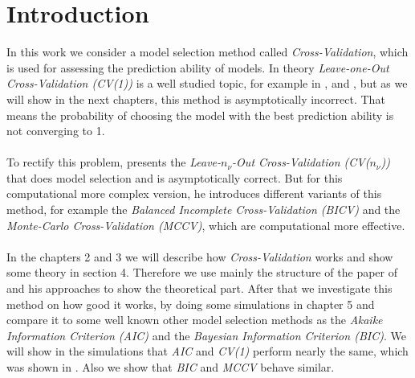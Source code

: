 \documentclass[Research_Module_ES.tex]{subfiles}
\begin{document}
\section{Introduction}	
In this work we consider a model selection method  called \textit{Cross-Validation}, which is used for assessing the prediction ability of models.
In theory \textit{Leave-one-Out Cross-Validation (CV(1))} is a well studied topic, for example in \cite{geisser1975predictive}, \cite{stone1974cross} and \cite{stone1977asymptotic}, but as we will show in the next chapters, this method is asymptotically incorrect. That means the probability of choosing the model with the best prediction ability is not converging to 1.\\\\
To rectify this problem, \cite{shao} presents the \textit{Leave-$n_\nu$-Out Cross-Validation (CV($n_\nu$))} that does model selection and is asymptotically correct. But for this computational more complex version, he introduces different variants of this method, for example the \textit{Balanced Incomplete Cross-Validation (BICV)} and the \textit{Monte-Carlo Cross-Validation (MCCV)}, which are computational more effective.\\\\ In the chapters 2 and 3 we will describe how \textit{Cross-Validation} works and show some theory in section 4. Therefore we use mainly the structure of the paper of \cite{shao} and his approaches to show the theoretical part. After that we investigate this method on how good it works, by doing some simulations in chapter 5 and compare it to some well known other model selection methods as the \textit{Akaike Information Criterion (AIC)} and the \textit{Bayesian Information Criterion (BIC)}.
We will show in the simulations that \textit{AIC} and \textit{CV(1)} perform nearly the same, which was shown in \cite{stone1977asymptotic}. Also we show that \textit{BIC} and \textit{MCCV} behave similar.
\end{document}
